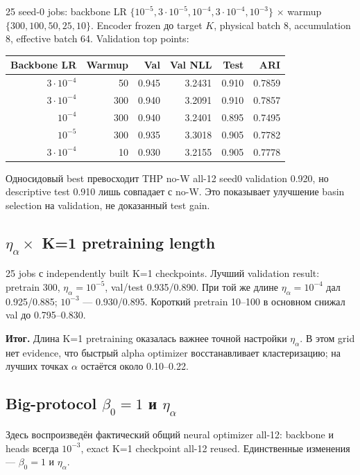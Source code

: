 \documentclass[11pt,a4paper]{article}
\newcommand{\boxnote}[2]{%
  \begin{center}\setlength{\fboxsep}{9pt}%
  \colorbox{#1}{\begin{minipage}{0.94\textwidth}\raggedright #2\par\end{minipage}}
  \end{center}}
\newcommand{\verdict}[1]{\boxnote{lightred}{\textbf{Итог.} #1}}
\begin{document}
25 seed-0 jobs: backbone LR $\{10^{-5},3\cdot10^{-5},10^{-4},3\cdot10^{-4},10^{-3}\}$
$\times$ warmup $\{300,100,50,25,10\}$. Encoder frozen до target $K$, physical
batch 8, accumulation 8, effective batch 64. Validation top points:

\begin{center}
\begin{tabular}{rrrrrr}
\toprule
Backbone LR & Warmup & Val & Val NLL & Test & ARI \\
\midrule
$3\cdot10^{-4}$ & 50 & 0.945 & 3.2431 & 0.910 & 0.7859 \\
$3\cdot10^{-4}$ & 300 & 0.940 & 3.2091 & 0.910 & 0.7857 \\
$10^{-4}$ & 300 & 0.940 & 3.2401 & 0.895 & 0.7495 \\
$10^{-5}$ & 300 & 0.935 & 3.3018 & 0.905 & 0.7782 \\
$3\cdot10^{-4}$ & 10 & 0.930 & 3.2155 & 0.905 & 0.7778 \\
\bottomrule
\end{tabular}
\end{center}

Односидовый best превосходит THP no-W all-12 seed0 validation 0.920, но
descriptive test 0.910 лишь совпадает с no-W. Это показывает улучшение basin
selection на validation, не доказанный test gain.

\subsection{\texorpdfstring{$\eta_\alpha\times$}{eta-alpha x} K=1 pretraining length}

25 jobs с independently built K=1 checkpoints. Лучший validation result:
pretrain 300, $\eta_\alpha=10^{-5}$, val/test 0.935/0.890. При той же длине
$\eta_\alpha=10^{-4}$ дал 0.925/0.885; $10^{-3}$ --- 0.930/0.895.
Короткий pretrain 10--100 в основном снижал val до 0.795--0.830.

\verdict{Длина K=1 pretraining оказалась важнее точной настройки $\eta_\alpha$.
В этом grid нет evidence, что быстрый alpha optimizer восстанавливает
кластеризацию; на лучших точках $\alpha$ остаётся около 0.10--0.22.}

\subsection{Big-protocol \texorpdfstring{$\beta_0=1$}{beta0=1} и
\texorpdfstring{$\eta_\alpha$}{eta-alpha}}

Здесь воспроизведён фактический общий neural optimizer all-12: backbone и heads
всегда $10^{-3}$, exact K=1 checkpoint all-12 reused. Единственные изменения ---
$\beta_0=1$ и $\eta_\alpha$.
\end{document}
